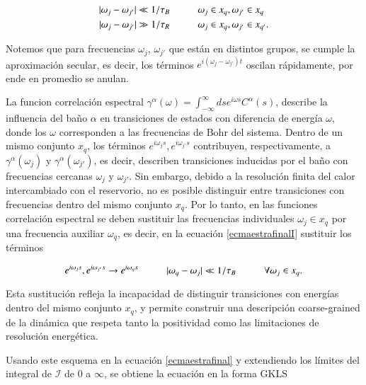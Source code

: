 \begin{align*}
    |\omega_{j}-\omega_{j'}| \ll 1/\tau_{B}  &\hspace{10mm} \omega_{j} \in x_{q}, \omega_{j'} \in x_{q} \\
    |\omega_{j}-\omega_{j'}| \gg 1/\tau_{R}  &\hspace{10mm} \omega_{j} \in x_{q}, \omega_{j'} \in x_{q'}.
\end{align*}

Notemos que para frecuencias $\omega_{j}$, $\omega_{j'}$ que están en distintos grupos, se cumple la aproximación secular, es decir, los términos $e^{i(\omega_{j} - \omega_{j'})t}$ oscilan rápidamente, por ende en  promedio se anulan.

La funcion correlación  espectral $\gamma^{\alpha}(\omega) = \int_{-\infty}^{\infty} ds e^{i \omega s} C^{\alpha}(s)$, describe la influencia del baño $\alpha$ en transiciones de estados con diferencia de energía $\omega$, donde los $\omega$ corresponden a las frecuencias de Bohr del sistema. Dentro de un mismo conjunto $x_{q}$, los términos $e^{i\omega_{j}s},e^{i\omega_{j'}s}$ contribuyen, respectivamente, a  $\gamma^{\alpha}(\omega_{j})$ y $\gamma^{\alpha}(\omega_{j'})$, es decir,  describen transiciones inducidas por el baño con frecuencias cercanas $\omega_{j}$ y $\omega_{j'}$. Sin embargo, debido a la resolución finita del calor intercambiado con el reservorio, no es posible distinguir entre transiciones con frecuencias dentro del mismo conjunto $x_q$. Por lo tanto, en las funciones correlación espectral se deben sustituir las frecuencias individuales $\omega_{j} \in x_{q}$ por una frecuencia auxiliar $\omega_{q}$, es decir, en la ecuación \ref{ecmaestrafinalI} sustituir los términos  

\begin{equation*}
    e^{i\omega_{j}s},e^{i\omega_{j'}s} \to e^{i\omega_{q}s} \hspace{10mm} |\omega_{q} - \omega_{j}| \ll 1/\tau_{B} \hspace{10mm} \forall \omega_{j} \in x_{q}.
\end{equation*}

Esta sustitución refleja la incapacidad de distinguir transiciones con energías dentro del mismo conjunto \( x_q \), y permite construir una descripción coarse-grained de la dinámica que respeta tanto la positividad como las limitaciones de resolución energética\cite{chruscinski2017brief}. 

Usando este esquema en la ecuación \ref{ecmaestrafinal} y extendiendo los límites del integral de $\mathcal{I}$ de 0 a $\infty$, se obtiene la ecuación en la forma GKLS

